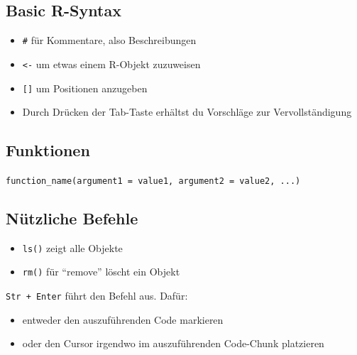 \documentclass[
  custompaper,
  DIV=11,
  numbers=noendperiod]{scrartcl}
\begin{document}
\subsection{Basic R-Syntax}\label{basic-r-syntax}

\begin{itemize}
\item
  \texttt{\#} für Kommentare, also Beschreibungen
\item
  \texttt{\textless{}-} um etwas einem R-Objekt zuzuweisen
\item
  \texttt{{[}{]}} um Positionen anzugeben
\item
  Durch Drücken der Tab-Taste erhältst du Vorschläge zur
  Vervollständigung
\end{itemize}

\subsection{Funktionen}\label{funktionen}

\texttt{function\_name(argument1\ =\ value1,\ argument2\ =\ value2,\ ...)}

\subsection{Nützliche Befehle}\label{nuxfctzliche-befehle}

\begin{itemize}
\item
  \texttt{ls()} zeigt alle Objekte
\item
  \texttt{rm()} für ``remove'' löscht ein Objekt
\end{itemize}

\begin{tcolorbox}[enhanced jigsaw, coltitle=black, toprule=.15mm, breakable, colframe=quarto-callout-note-color-frame, leftrule=.75mm, arc=.35mm, opacitybacktitle=0.6, title=\textcolor{quarto-callout-note-color}{\faInfo}\hspace{0.5em}{Befehle ausführen}, rightrule=.15mm, colback=white, titlerule=0mm, bottomtitle=1mm, toptitle=1mm, bottomrule=.15mm, left=2mm, opacityback=0, colbacktitle=quarto-callout-note-color!10!white]

\texttt{Str\ +\ Enter} führt den Befehl aus. Dafür:

\begin{itemize}
\item
  entweder den auszuführenden Code markieren
\item
  oder den Cursor irgendwo im auszuführenden Code-Chunk platzieren
\end{itemize}

\end{tcolorbox}
\end{document}
